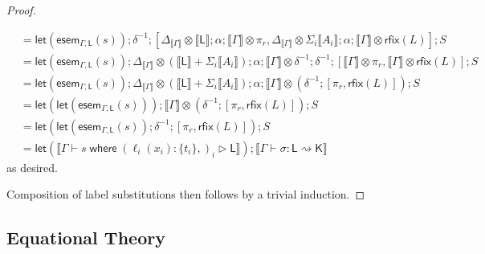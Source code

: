 \documentclass[acmsmall,screen,review]{acmart}
\newcommand{\ms}[1]{\ensuremath{\mathsf{#1}}}
\newcommand{\lto}{:}
\newcommand{\where}[2]{#1\;\ms{where}\;#2}
\newcommand{\wbranch}[3]{#1(#2) \lto \{#3\}}
\newcommand{\haslb}[3]{#1 \vdash #2 \rhd #3}
\newcommand{\lbsubst}[4]{#1 \vdash #2: #3 \rightsquigarrow #4}
\newcommand{\dnt}[1]{\llbracket{#1}\rrbracket}
\newcommand{\entrymor}[3]{\ms{esem}_{#1, #3}(#2)}
\newcommand{\lmor}[1]{\ms{let}(#1)}
\newcommand{\rfix}[1]{\ms{rfix}(#1)}
\begin{document}
\begin{proof}
\begin{itemize}[leftmargin=*]
\begin{equation}
\begin{aligned}
        & = \lmor{\entrymor{\Gamma}{s}{\ms{L}}} ; \delta^{-1} ; [
              \Delta_{\dnt{\Gamma}} \otimes \dnt{\ms{L}} ; \alpha ; \dnt{\Gamma} \otimes \pi_r, 
              \Delta_{\dnt{\Gamma}} \otimes \Sigma_i\dnt{A_i} ; \alpha 
                ; \dnt{\Gamma} \otimes \rfix{L}
            ]
          ; S \\
        & = \lmor{\entrymor{\Gamma}{s}{\ms{L}}} 
          ; \Delta_{\dnt{\Gamma}} \otimes (\dnt{\ms{L}} + \Sigma_i\dnt{A_i}) ; \alpha
          ; \dnt{\Gamma} \otimes \delta^{-1} ; \delta^{-1}
          ; [
              \dnt{\Gamma} \otimes \pi_r, 
              \dnt{\Gamma} \otimes \rfix{L}
            ]
          ; S \\
        & = \lmor{\entrymor{\Gamma}{s}{\ms{L}}} 
          ; \Delta_{\dnt{\Gamma}} \otimes (\dnt{\ms{L}} + \Sigma_i\dnt{A_i}) ; \alpha
          ; \dnt{\Gamma} \otimes (\delta^{-1} ; [\pi_r, \rfix{L}])
          ; S \\
        & = \lmor{\lmor{\entrymor{\Gamma}{s}{\ms{L}}}}
          ; \dnt{\Gamma} \otimes (\delta^{-1} ; [\pi_r, \rfix{L}])
          ; S \\
        & = \lmor{\lmor{\entrymor{\Gamma}{s}{\ms{L}}} ; \delta^{-1} ; [\pi_r, \rfix{L}] }
          ; S \\
        & = \lmor{\dnt{\haslb{\Gamma}{\where{s}{(\wbranch{\ell_i}{x_i}{t_i},)_i}}{\ms{L}}}}
          ; \dnt{\lbsubst{\Gamma}{\sigma}{\ms{L}}{\ms{K}}}
      \end{aligned}
    \end{equation}
    as desired.
  \end{itemize}
  Composition of label substitutions then follows by a trivial induction.
\end{proof}

\subsection{Equational Theory}

\soundnesseqn*

\label{proof:soundness-eqn}
\end{document}
